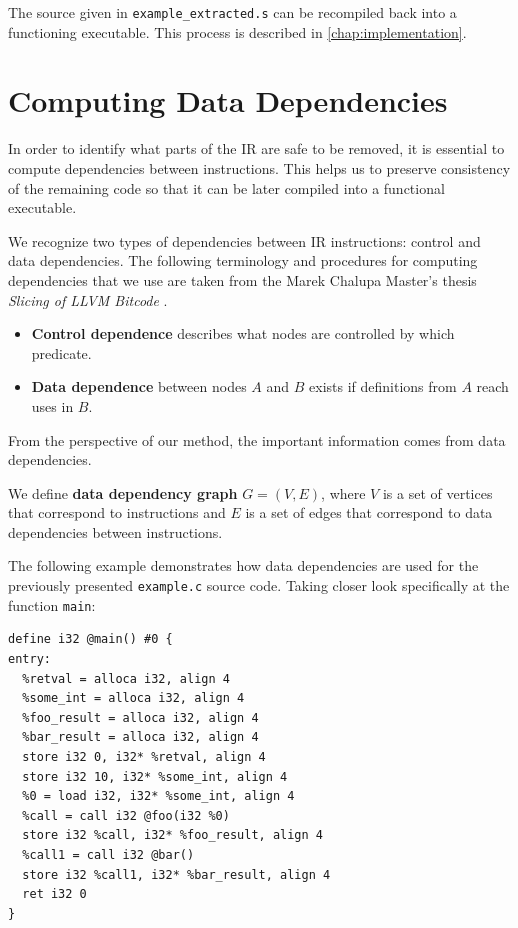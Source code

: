 \documentclass[12pt, twoside]{fithesis2}
\renewcommand{\_}{\leavevmode \kern0.07em\vbox{\hrule width0.4em}}
\newcommand{\squarebullet}{\textcolor{black}{\raisebox{0.15em}{\rule{4pt}{4pt}}}}
\newenvironment{myItemize}{
  \begin{itemize}[
    leftmargin=2em,
    rightmargin=1em,
    itemsep=\parskip,
    parsep=0em,
    topsep=0em,
    partopsep=0em
]
  \renewcommand{\labelitemi}{\squarebullet}
  \renewcommand{\labelitemii}{\textbullet}
}{
  \end{itemize}
}
\begin{document}
The source given in \texttt{example_extracted.s} can be recompiled
back into a functioning executable. This process is described in
\autoref{chap:implementation}.


\section{Computing Data Dependencies}
\label{sec:design-dep}

In order to identify what parts of the IR are safe to be removed, it is
essential to compute dependencies between instructions.
This helps us to preserve consistency of the remaining code so that it can be
later compiled into a functional executable.

We recognize two types of dependencies between IR instructions: control and
data dependencies.  The following terminology and procedures for computing
dependencies that we use are taken from the Marek Chalupa Master's thesis
\textit{Slicing of LLVM Bitcode} \cite{dg}.

\begin{myItemize}
\item \textbf{Control dependence} describes what nodes are controlled by which predicate.
\item \textbf{Data dependence} between nodes $A$ and $B$ exists if definitions
from $A$ reach uses in $B$.
\end{myItemize}

From the perspective of our method, the important information comes from data
dependencies.

We define \textbf{data dependency graph} $G=(V,E)$, where $V$ is a set of
vertices that correspond to instructions and $E$ is a set of edges that
correspond to data dependencies between instructions.

The following example demonstrates how data dependencies are used for the
previously presented \texttt{example.c} source code.
Taking closer look specifically at the function \texttt{main}:

\begin{verbatim}
define i32 @main() #0 {
entry:
  %retval = alloca i32, align 4
  %some_int = alloca i32, align 4
  %foo_result = alloca i32, align 4
  %bar_result = alloca i32, align 4
  store i32 0, i32* %retval, align 4
  store i32 10, i32* %some_int, align 4
  %0 = load i32, i32* %some_int, align 4
  %call = call i32 @foo(i32 %0)
  store i32 %call, i32* %foo_result, align 4
  %call1 = call i32 @bar()
  store i32 %call1, i32* %bar_result, align 4
  ret i32 0
}
\end{verbatim}
\end{document}
